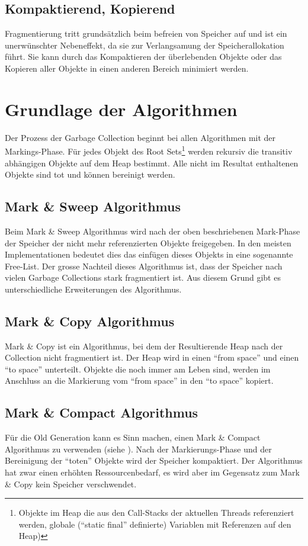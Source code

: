 \subsection{Kompaktierend, Kopierend}
Fragmentierung tritt grundsätzlich beim befreien von Speicher auf und ist ein unerwünschter Nebeneffekt, da sie zur Verlangsamung der Speicherallokation führt. Sie kann durch das Kompaktieren der überlebenden Objekte oder das Kopieren aller Objekte in einen anderen Bereich minimiert werden.

\section{Grundlage der Algorithmen}
Der Prozess der Garbage Collection beginnt bei allen Algorithmen mit der Markings-Phase. Für jedes Objekt des Root Sets\footnote{Objekte im Heap die aus den Call-Stacks der aktuellen Threads referenziert werden, globale (``static final'' definierte) Variablen mit Referenzen auf den Heap)} werden rekursiv die transitiv abhängigen Objekte auf dem Heap bestimmt. Alle nicht im Resultat enthaltenen Objekte sind tot und können bereinigt werden.

\subsection{Mark \& Sweep Algorithmus}
Beim Mark \& Sweep Algorithmus wird nach der oben beschriebenen Mark-Phase der Speicher der nicht mehr referenzierten Objekte freigegeben. In den meisten Implementationen bedeutet dies das einfügen dieses Objekts in eine sogenannte Free-List. Der grosse Nachteil dieses Algorithmus ist, dass der Speicher nach vielen Garbage Collections stark fragmentiert ist. Aus diesem Grund gibt es unterschiedliche Erweiterungen des Algorithmus.

\subsection{Mark \& Copy Algorithmus}
Mark \& Copy ist ein Algorithmus, bei dem der Resultierende Heap nach der Collection nicht fragmentiert ist. Der Heap wird in einen ``from space'' und einen ``to space'' unterteilt. Objekte die noch immer am Leben sind, werden im Anschluss an die Markierung vom ``from space'' in den ``to space'' kopiert.

\subsection{Mark \& Compact Algorithmus}
Für die Old Generation kann es Sinn machen, einen Mark \& Compact Algorithmus zu verwenden (siehe ). Nach der Markierungs-Phase und der Bereinigung der ``toten'' Objekte wird der Speicher kompaktiert. Der Algorithmus hat zwar einen erhöhten Ressourcenbedarf, es wird aber im Gegensatz zum Mark \& Copy kein Speicher verschwendet. 

